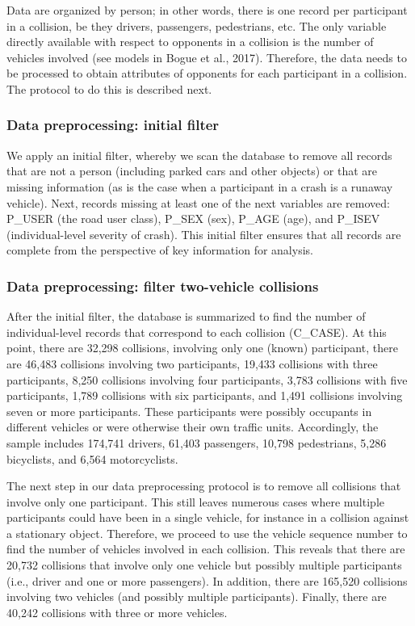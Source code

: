 \documentclass[]{elsarticle} %
\begin{document}
Data are organized by person; in other words, there is one record per
participant in a collision, be they drivers, passengers, pedestrians,
etc. The only variable directly available with respect to opponents in a
collision is the number of vehicles involved (see models in Bogue et
al., 2017). Therefore, the data needs to be processed to obtain
attributes of opponents for each participant in a collision. The
protocol to do this is described next.

\hypertarget{data-preprocessing-initial-filter}{%
\subsubsection{Data preprocessing: initial
filter}\label{data-preprocessing-initial-filter}}

We apply an initial filter, whereby we scan the database to remove all
records that are not a person (including parked cars and other objects)
or that are missing information (as is the case when a participant in a
crash is a runaway vehicle). Next, records missing at least one of the
next variables are removed: P\_USER (the road user class), P\_SEX (sex),
P\_AGE (age), and P\_ISEV (individual-level severity of crash). This
initial filter ensures that all records are complete from the
perspective of key information for analysis.

\hypertarget{data-preprocessing-filter-two-vehicle-collisions}{%
\subsubsection{Data preprocessing: filter two-vehicle
collisions}\label{data-preprocessing-filter-two-vehicle-collisions}}

After the initial filter, the database is summarized to find the number
of individual-level records that correspond to each collision (C\_CASE).
At this point, there are 32,298 collisions, involving only one (known)
participant, there are 46,483 collisions involving two participants,
19,433 collisions with three participants, 8,250 collisions involving
four participants, 3,783 collisions with five participants, 1,789
collisions with six participants, and 1,491 collisions involving seven
or more participants. These participants were possibly occupants in
different vehicles or were otherwise their own traffic units.
Accordingly, the sample includes 174,741 drivers, 61,403 passengers,
10,798 pedestrians, 5,286 bicyclists, and 6,564 motorcyclists.

The next step in our data preprocessing protocol is to remove all
collisions that involve only one participant. This still leaves numerous
cases where multiple participants could have been in a single vehicle,
for instance in a collision against a stationary object. Therefore, we
proceed to use the vehicle sequence number to find the number of
vehicles involved in each collision. This reveals that there are 20,732
collisions that involve only one vehicle but possibly multiple
participants (i.e., driver and one or more passengers). In addition,
there are 165,520 collisions involving two vehicles (and possibly
multiple participants). Finally, there are 40,242 collisions with three
or more vehicles.
\end{document}
